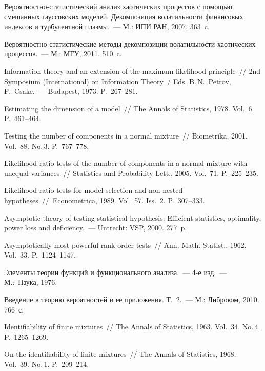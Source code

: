 \begin{multicols}{2}

{\small\frenchspacing
{%
\begin{thebibliography}{99}

 Ве\-ро\-ят\-ност\-но-ста\-ти\-сти\-че\-ский
анализ хаотических процессов с помощью смешанных гауссовских моделей.
Декомпозиция волатильности финансовых индексов и турбулентной
плазмы.~--- М.: ИПИ РАН, 2007. 363~c.

 Ве\-ро\-ят\-ност\-но-ста\-ти\-сти\-че\-ские
методы декомпозиции волатильности хаотических процессов.~--- М.: МГУ,
2011. 510~c.

 Information theory and an extension
of the maximum likelihood principle~// 2nd Symposium (International) 
on Information Theory~/ Eds. B.\,N.~Petrov, F.~Csake.~--- Budapest, 1973. P.~267--281.

 Estimating the
dimension of a model~// The Annals of Statistics, 1978. Vol.~6.
P.~461--464.

Testing the number of components in a normal mixture~// Biometrika,
2001. Vol.~88. No.\,3. P.~767--778.

  Likelihood ratio tests of the number of
components in a normal mixture with unequal variances~// Statistics
and Probability Lett., 2005. Vol.~71. P.~225--235.

 Likelihood ratio tests for model
selection and non-nested hypotheses~//~Econometrica, 1989. Vol.~57. Iss.~2. P.~307--333.

 Asymptotic theory of testing
statistical hypothesis: Efficient statistics, optimality, power loss
and deficiency.~--- Untrecht: VSP, 2000. 277~p.

 Asymptotically most powerful
rank-order tests~// Ann. Math. Statist., 1962. Vol.~33. P.~1124--1147.

Элементы теории функций и функционального анализа.~--- 4-е изд.~---
М.:~Наука, 1976.

 Введение в теорию
вероятностей и ее приложения. Т.~2.~--- М.: Либроком, 2010. 766~с.

  Identifiability of finite mixtures~// The
Annals of Statistics, 1963. Vol.~34. No.\,4. P.~1265--1269.

\label{end\stat}

  On the
identifiability of finite mixtures~// The Annals of Statistics,
1968. Vol.~39. No.\,1. P.~209--214.
 \end{thebibliography}
}
}


\end{multicols}       